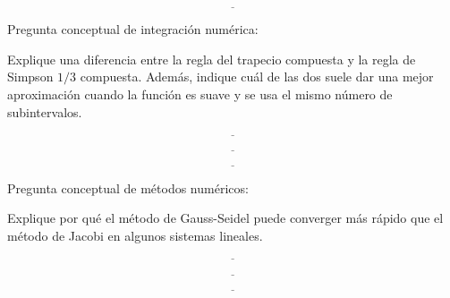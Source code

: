 \documentclass[10pt,respuestas,a4]{aleph-examen}
\begin{document}
\begin{preguntas}
\[
\underline{\hspace{14cm}}
\]


\item
Pregunta conceptual de integración numérica: 

Explique una diferencia entre la regla del trapecio compuesta y la regla de Simpson $1/3$ compuesta. Además, indique cuál de las dos suele dar una mejor aproximación cuando la función es suave y se usa el mismo número de subintervalos.

\[
\underline{\hspace{14cm}}
\]

\[
\underline{\hspace{14cm}}
\]

\[
\underline{\hspace{14cm}}
\]


\item
Pregunta conceptual de métodos numéricos: 

Explique por qué el método de Gauss-Seidel puede converger más rápido que el método de Jacobi en algunos sistemas lineales.

\[
\underline{\hspace{14cm}}
\]

\[
\underline{\hspace{14cm}}
\]

\[
\underline{\hspace{14cm}}
\]

\end{preguntas}
\end{document}
